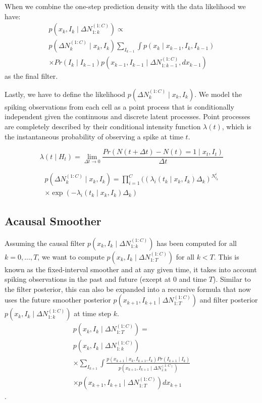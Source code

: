 \documentclass[conference]{IEEEtran}
\begin{document}
When we combine the one-step prediction density with the data likelihood we have:
\begin{multline}
p(x_{k}, I_{k} \mid \Delta N_{1:k}^{(1:C)}) \propto \\
p(\Delta N_{k}^{(1:C)}  \mid x_{k}, I_{k}) \sum_{I_{k-1}} \int p(x_{k} \mid x_{k-1}, I_{k}, I_{k-1}) \\
\times Pr(I_{k} \mid I_{k-1}) p(x_{k-1}, I_{k-1} \mid \Delta N_{1:k-1}^{(1:C)}, dx_{k-1})
\end{multline}
as the final filter.

Lastly, we have to define the likelihood $p(\Delta N_{k}^{(1:C)} \mid x_{k}, I_{k})$. We model the spiking observations from each cell as a point process that is conditionally independent given the continuous and discrete latent processes. Point processes are completely described by their conditional intensity function $\lambda(t)$, which is the instantaneous probability of observing a spike at time $t$.

\begin{equation}
    \lambda(t \mid H_{t}) = \lim_{\Delta t \rightarrow{0}} \frac{Pr(N(t + \Delta t) - N(t) = 1 \mid x_{t}, I_{t})}{\Delta t}
\end{equation}


\begin{multline}
    p(\Delta N_{k}^{(1:C)} \mid x_{k}, I_{k}) = \prod^{C}_{i=1} ((\lambda_{i}(t_{k} \mid x_{k}, I_{k})\Delta_{k})^{N_{t_{k}}^{i}} \\
    \times \exp(-\lambda_{i}(t_{k} \mid x_{k}, I_{k})\Delta_{k})
\end{multline}

\subsection{Acausal Smoother}
Assuming the causal filter $p(x_{k}, I_{k} \mid \Delta N_{1:k}^{(1:C)})$ has been computed for all $k = 0, ..., T$, we want to compute $p(x_{k}, I_{k} \mid \Delta N_{1:T}^{(1:C)})$ for all $k < T$. This is known as the fixed-interval smoother and at any given time, it takes into account spiking observations in the past and future (except at 0 and time $T$). Similar to the filter posterior, this can also be expanded into a recursive formula that now uses the future smoother posterior $p(x_{k+1}, I_{k+1} \mid \Delta N_{1:T}^{(1:C)})$ and filter posterior $p(x_{k}, I_{k} \mid \Delta N_{1:k}^{(1:C)})$ at time step $k$.
\begin{multline}
p(x_{k}, I_{k} \mid \Delta N_{1:T}^{(1:C)}) = \\
p(x_{k}, I_{k} \mid \Delta N_{1:k}^{(1:C)}) \\
\times \sum_{I_{k+1}} \int \frac{p(x_{k+1} \mid x_{k}, I_{k+1}, I_{k}) Pr(I_{k+1} \mid I_{k})}{p(x_{k+1}, I_{k+1} \mid \Delta N_{1:k}^{(1:C)})} \\
\times p(x_{k+1}, I_{k+1} \mid \Delta N_{1:T}^{(1:C)}) dx_{k+1}
\end{multline}.
\end{document}
